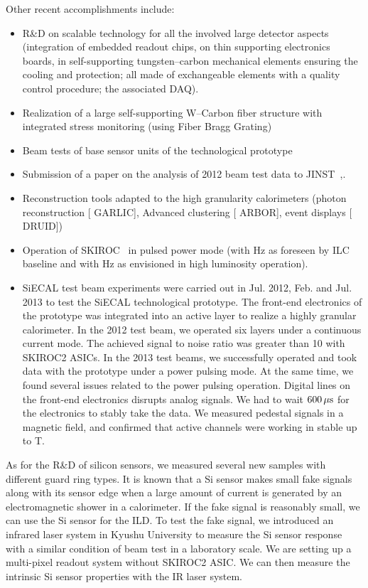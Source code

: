 Other recent accomplishments include:
\begin{itemize}
	\item R\&D on scalable technology for all the involved large detector aspects (integration of embedded readout chips, on thin supporting electronics boards, in self-supporting tungsten--carbon mechanical elements ensuring the cooling and protection; all made of exchangeable elements with a quality control procedure; the associated DAQ).
	\item {} Realization of a large self-supporting W--Carbon fiber structure with integrated stress monitoring (using Fiber Bragg Grating)
	\item Beam tests of base sensor units of the technological prototype
	\item Submission of a paper on the analysis of 2012 beam test data to JINST~\cite{Rouene2013470},\cite{Frisson:2013:CIN023}.
	\item {} Reconstruction tools adapted to the high granularity calorimeters (photon reconstruction [ GARLIC], Advanced clustering [ ARBOR], event displays [ DRUID])
	\item Operation of SKIROC~\cite{1748-0221-6-12-C12040} in pulsed power mode (with \unit[5]{Hz} as foreseen by ILC baseline and with \unit[10]{Hz} as envisioned in high luminosity operation).
	\item SiECAL test beam experiments were carried out in Jul. 2012, Feb. and Jul. 2013 to test the SiECAL technological prototype. The front-end electronics of the prototype was integrated into an active layer to realize a highly granular calorimeter. In the 2012 test beam, we operated six layers under a continuous current mode. The achieved signal to noise ratio was greater than 10 with SKIROC2 ASICs. In the 2013 test beams, we successfully operated and took data with the prototype under a power pulsing mode. At the same time, we found several issues related to the power pulsing operation. Digital lines on the front-end electronics disrupts analog signals. We had to wait $\unit[600]{\mu s}$ for the electronics to stably take the data. We measured pedestal signals in a magnetic field, and confirmed that active channels were working in stable up to \unit[2]{T}.
\end{itemize}
As for the R\&D of silicon sensors, we measured several new samples with different guard ring types. It is known that a Si sensor makes small fake signals along with its sensor edge when a large amount of current is generated by an electromagnetic shower in a calorimeter. If the fake signal is reasonably small, we can use the Si sensor for the ILD. To test the fake signal, we introduced an infrared laser system in Kyushu University to measure the Si sensor response with a similar condition of beam test in a laboratory scale. We are setting up a multi-pixel readout system without SKIROC2 ASIC. We can then measure the intrinsic Si sensor properties with the IR laser system.
